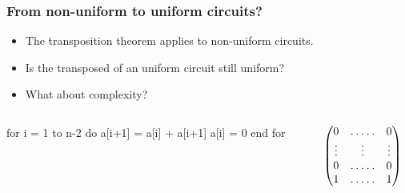 \documentclass[10pt]{beamer}
\begin{document}
\begin{frame}[fragile]
  \frametitle{From non-uniform to uniform circuits?}
  
  {\large
    \begin{itemize}
    \item The transposition theorem applies to non-uniform circuits.
    \item Is the transposed of an uniform circuit still uniform?
    \item What about complexity?
    \end{itemize}}

    \begin{columns}

    \begin{column}{0.5\textwidth}
      \begin{center}
        \begin{minipage}{0.7\textwidth}
\begin{semiverbatim}
  for i = 1 to n-2 do
    a[i+1] = a[i] + a[i+1]
    a[i] = 0
  end for
\end{semiverbatim}
        \end{minipage}
      \end{center}
    \end{column}

    \begin{column}{0.5\textwidth}

      \begin{equation*}
        \begin{pmatrix}
          0 & \hdotsfor{3} & 0\\
          \vdots  &  &\vdots&& \vdots \\
          0 & \hdotsfor{3} & 0\\
          1 & \hdotsfor{3} & 1
        \end{pmatrix}
      \end{equation*}

    \end{column}
  \end{columns}


\end{frame}

\end{document}
